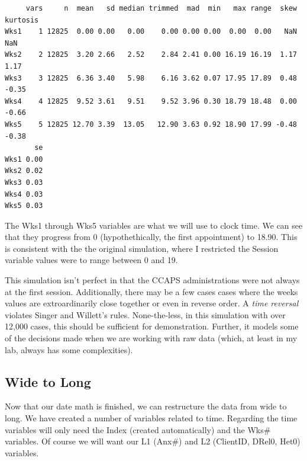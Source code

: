 \documentclass[
  english,
]{book}
\begin{document}
\begin{verbatim}
     vars     n  mean   sd median trimmed  mad  min   max range  skew kurtosis
Wks1    1 12825  0.00 0.00   0.00    0.00 0.00 0.00  0.00  0.00   NaN      NaN
Wks2    2 12825  3.20 2.66   2.52    2.84 2.41 0.00 16.19 16.19  1.17     1.17
Wks3    3 12825  6.36 3.40   5.98    6.16 3.62 0.07 17.95 17.89  0.48    -0.35
Wks4    4 12825  9.52 3.61   9.51    9.52 3.96 0.30 18.79 18.48  0.00    -0.66
Wks5    5 12825 12.70 3.39  13.05   12.90 3.63 0.92 18.90 17.99 -0.48    -0.38
       se
Wks1 0.00
Wks2 0.02
Wks3 0.03
Wks4 0.03
Wks5 0.03
\end{verbatim}

The Wks1 through Wks5 variables are what we will use to clock time. We can see that they progress from 0 (hypothethically, the first appointment) to 18.90. This is consistent with the the original simulation, where I restricted the Session variable values were to range between 0 and 19.

This simulation isn't perfect in that the CCAPS administrations were not always at the first session. Additionally, there may be a few cases cases where the weeks values are extroardinarily close together or even in reverse order. A \emph{time reversal} violates Singer and Willett's \citeyearpar{singer_applied_2003} rules. None-the-less, in this simulation with over 12,000 cases, this should be sufficient for demonstration. Further, it models some of the decisions made when we are working with raw data (which, at least in my lab, always has some complexities).

\hypertarget{wide-to-long}{%
\subsection{Wide to Long}\label{wide-to-long}}

Now that our date math is finished, we can restructure the data from wide to long. We have created a number of variables related to time. Regarding the time variables will only need the Index (created automatically) and the Wks\# variables. Of course we will want our L1 (Anx\#) and L2 (ClientID, DRel0, Het0) variables.
\end{document}
